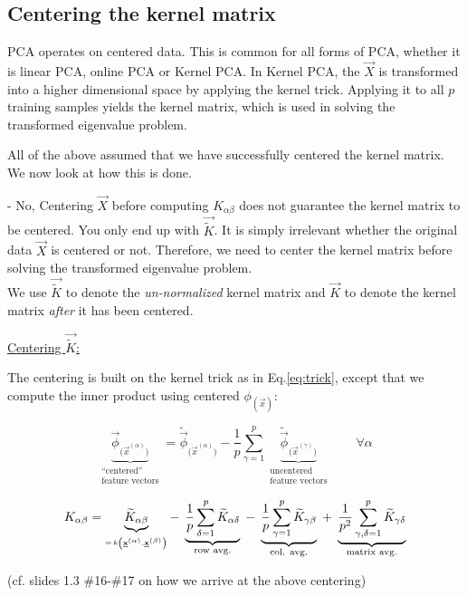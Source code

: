 

\subsection{Centering the kernel matrix}

PCA operates on centered data. This is common for all forms  of PCA, 
whether it is linear PCA, online PCA or Kernel PCA.
In Kernel PCA, the $\vec X$ is transformed into a higher dimensional space by applying the kernel trick.
Applying it to all $p$ training samples yields the kernel matrix, which is used in solving the transformed eigenvalue problem.

All of the above assumed that we have successfully centered the kernel matrix. We now look at how this is done.


- No, Centering $\vec X$ before computing $K_{\alpha \beta}$ does not guarantee the kernel matrix to be centered. You only end up with $\vec{\widetilde K}$. 
It is simply irrelevant whether the original data $\vec X$ is centered or not. 
Therefore, we need to center the kernel matrix before solving the transformed eigenvalue problem.\\

We use $\vec{\widetilde K}$ to denote the \emph{un-normalized} kernel matrix and $\vec K$ 
to denote the kernel matrix \emph{after} it has been centered.

\underline{Centering $\vec{\widetilde K}$:}

The centering is built on the kernel trick as in Eq.\ref{eq:trick}, except that we compute the inner product using centered $\phi_{(\vec x)}$:

\begin{equation*}
	\underbrace{ \vec{\phi}_{\big( \vec{x}^{(\alpha)} \big)} }_{
		\substack{ 	\text{``centered''} \\
				\text{feature vectors}} }
	= \widetilde{\vec{\phi}}_{\big( \vec{x}^{(\alpha)} \big)}
		- \frac{1}{p} \sum\limits_{\gamma = 1}^p 
		\underbrace{ \widetilde{\vec{\phi}}_{\big( \vec{x}^{(\gamma)} 
				\big)} }_{
			\substack{ 	\text{uncentered} \\
					\text{feature vectors}} }
					\qquad \forall \alpha
\end{equation*}

\begin{equation*}
	K_{\alpha \beta} = \underbrace{\widetilde{K}_{\alpha \beta}}_{ _{= \, k \left ( \vec{x}^{(\alpha)},
			\vec{x}^{(\beta)} \right )}}
		- \;\underbrace{\frac{1}{p} \sum\limits_{\delta = 1}^p 
		\widetilde{K}_{\alpha \delta}}_\text{\scriptsize{row avg.}} 
		\; - \; \underbrace{\frac{1}{p} 
		\sum\limits_{\gamma = 1}^p 
		\widetilde{K}_{\gamma \beta}}_\text{\scriptsize{col. avg.}}
		\;+ \;\underbrace{\frac{1}{p^2} 
		\sum\limits_{\gamma, \delta = 1}^p 
		\widetilde{K}_{\gamma \delta}}_\text{\scriptsize{matrix avg.}}
\end{equation*}%

(cf. slides 1.3 \#16-\#17 on how we arrive at the above centering)
